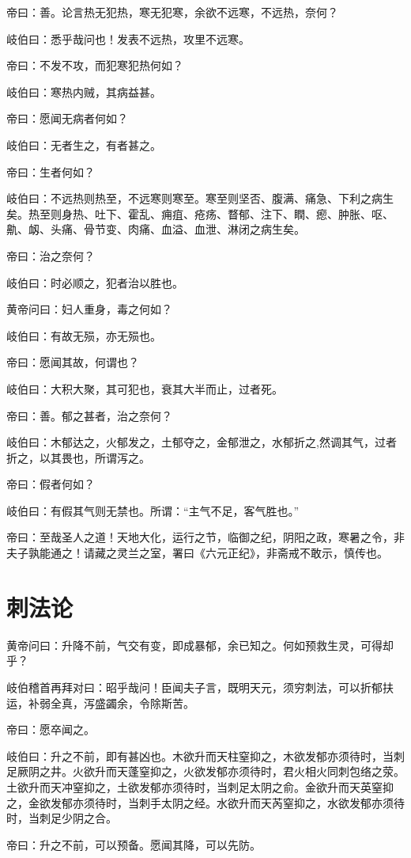 \documentclass{article}%
\begin{document}
帝曰：善。论言热无犯热，寒无犯寒，余欲不远寒，不远热，奈何？

岐伯曰：悉乎哉问也！发表不远热，攻里不远寒。

帝曰：不发不攻，而犯寒犯热何如？

岐伯曰：寒热内贼，其病益甚。

帝曰：愿闻无病者何如？

岐伯曰：无者生之，有者甚之。

帝曰：生者何如？

岐伯曰：不远热则热至，不远寒则寒至。寒至则坚否、腹满、痛急、下利之病生矣。热至则身热、吐下、霍乱、痈疽、疮疡、瞀郁、注下、瞤、瘛、肿胀、呕、鼽、衂、头痛、骨节变、肉痛、血溢、血泄、淋闭之病生矣。

帝曰：治之奈何？

岐伯曰：时必顺之，犯者治以胜也。

黄帝问曰：妇人重身，毒之何如？

岐伯曰：有故无殒，亦无殒也。

帝曰：愿闻其故，何谓也？

岐伯曰：大积大聚，其可犯也，衰其大半而止，过者死。

帝曰：善。郁之甚者，治之奈何？

岐伯曰：木郁达之，火郁发之，土郁夺之，金郁泄之，水郁折之,然调其气，过者折之，以其畏也，所谓泻之。

帝曰：假者何如？

岐伯曰：有假其气则无禁也。所谓：“主气不足，客气胜也。”

帝曰：至哉圣人之道！天地大化，运行之节，临御之纪，阴阳之政，寒暑之令，非夫子孰能通之！请藏之灵兰之室，署曰《六元正纪》，非斋戒不敢示，慎传也。
\section{刺法论}
黄帝问曰：升降不前，气交有变，即成暴郁，余已知之。何如预救生灵，可得却乎？

岐伯稽首再拜对曰：昭乎哉问！臣闻夫子言，既明天元，须穷刺法，可以折郁扶运，补弱全真，泻盛蠲余，令除斯苦。

帝曰：愿卒闻之。

岐伯曰：升之不前，即有甚凶也。木欲升而天柱窒抑之，木欲发郁亦须待时，当刺足厥阴之井。火欲升而天蓬窒抑之，火欲发郁亦须待时，君火相火同刺包络之荥。土欲升而天冲窒抑之，土欲发郁亦须待时，当刺足太阴之俞。金欲升而天英窒抑之，金欲发郁亦须待时，当刺手太阴之经。水欲升而天芮窒抑之，水欲发郁亦须待时，当刺足少阴之合。

帝曰：升之不前，可以预备。愿闻其降，可以先防。
\end{document}
